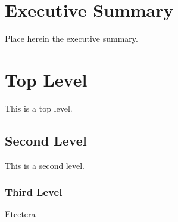 \section{Executive Summary}
Place herein the executive summary.
\section{Top Level}
This is a top level.
\subsection{Second Level}
This is a second level.
\subsubsection{Third Level}
Etcetera
